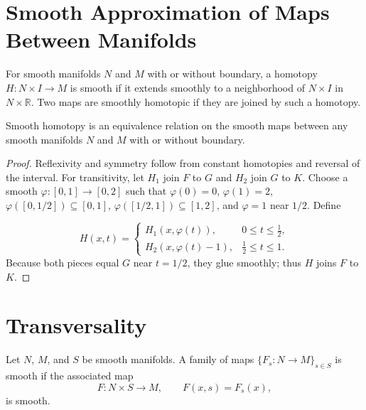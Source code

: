 \section{Smooth Approximation of Maps Between Manifolds}

\begin{definition}
\label{def:6-43-extra-1}




For smooth manifolds $N$ and $M$ with or without boundary, a homotopy $H:N\times I\to M$ is smooth if it extends smoothly to a neighborhood of $N\times I$ in $N\times\mathbb{R}$. Two maps are smoothly homotopic if they are joined by such a homotopy.
\end{definition}

\begin{lemma}
\label{lem:6-28}




Smooth homotopy is an equivalence relation on the smooth maps between any smooth manifolds $N$ and $M$ with or without boundary.
\end{lemma}

\begin{proof}

\sketch Reflexivity and symmetry follow from constant homotopies and reversal of the interval. For transitivity, let $H_1$ join $F$ to $G$ and $H_2$ join $G$ to $K$. Choose a smooth $\varphi:[0,1]\to[0,2]$ such that $\varphi(0)=0$, $\varphi(1)=2$, $\varphi([0,1/2])\subseteq[0,1]$, $\varphi([1/2,1])\subseteq[1,2]$, and $\varphi=1$ near $1/2$. Define

\[
H(x,t)=\begin{cases}
H_1(x,\varphi(t)),&0\leq t\leq \tfrac12,\\
H_2(x,\varphi(t)-1),&\tfrac12\leq t\leq1.
\end{cases}
\]
Because both pieces equal $G$ near $t=1/2$, they glue smoothly; thus $H$ joins $F$ to $K$.
\end{proof}


\section{Transversality}

\begin{definition}
\label{def:6-44-extra-2}




Let $N$, $M$, and $S$ be smooth manifolds. A family of maps $\{F_s:N\to M\}_{s\in S}$ is smooth if the associated map
\[
F:N\times S\to M,
\qquad F(x,s)=F_s(x),
\]
is smooth.
\end{definition}


